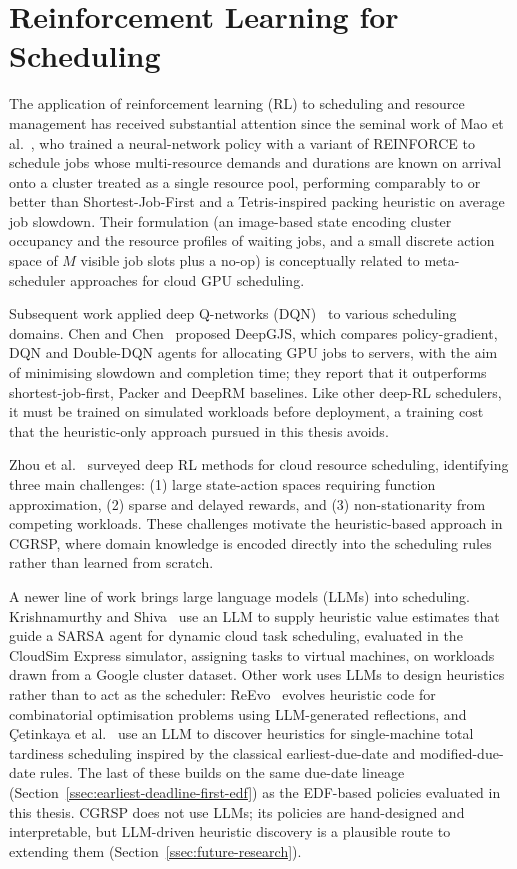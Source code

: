 \section{Reinforcement Learning for Scheduling}
\label{sec:reinforcement-learning-for-scheduling}

The application of reinforcement learning (RL) to scheduling and resource management has received substantial attention since the seminal work of Mao et al.~\cite{mao2016resource}, who trained a neural-network policy with a variant of REINFORCE to schedule jobs whose multi-resource demands and durations are known on arrival onto a cluster treated as a single resource pool, performing comparably to or better than Shortest-Job-First and a Tetris-inspired packing heuristic on average job slowdown. Their formulation (an image-based state encoding cluster occupancy and the resource profiles of waiting jobs, and a small discrete action space of $M$ visible job slots plus a no-op) is conceptually related to meta-scheduler approaches for cloud GPU scheduling.

Subsequent work applied deep Q-networks (DQN)~\cite{mnih2015human} to various scheduling domains. Chen and Chen~\cite{chen2023gpu} proposed DeepGJS, which compares policy-gradient, DQN and Double-DQN agents for allocating GPU jobs to servers, with the aim of minimising slowdown and completion time; they report that it outperforms shortest-job-first, Packer and DeepRM baselines. Like other deep-RL schedulers, it must be trained on simulated workloads before deployment, a training cost that the heuristic-only approach pursued in this thesis avoids.

Zhou et al.~\cite{zhou2024deep} surveyed deep RL methods for cloud resource scheduling, identifying three main challenges: (1) large state-action spaces requiring function approximation, (2) sparse and delayed rewards, and (3) non-stationarity from competing workloads. These challenges motivate the heuristic-based approach in CGRSP, where domain knowledge is encoded directly into the scheduling rules rather than learned from scratch.

A newer line of work brings large language models (LLMs) into scheduling. Krishnamurthy and Shiva~\cite{krishnamurthy2025llmsarsa} use an LLM to supply heuristic value estimates that guide a SARSA agent for dynamic cloud task scheduling, evaluated in the CloudSim Express simulator, assigning tasks to virtual machines, on workloads drawn from a Google cluster dataset. Other work uses LLMs to design heuristics rather than to act as the scheduler: ReEvo~\cite{ye2024reevo} evolves heuristic code for combinatorial optimisation problems using LLM-generated reflections, and {\c{C}}etinkaya et al.~\cite{cetinkaya2025discovering} use an LLM to discover heuristics for single-machine total tardiness scheduling inspired by the classical earliest-due-date and modified-due-date rules. The last of these builds on the same due-date lineage (Section~\ref{ssec:earliest-deadline-first-edf}) as the EDF-based policies evaluated in this thesis. CGRSP does not use LLMs; its policies are hand-designed and interpretable, but LLM-driven heuristic discovery is a plausible route to extending them (Section~\ref{ssec:future-research}).

